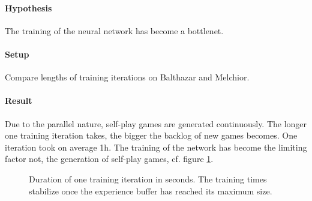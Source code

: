 \paragraph{Hypothesis} The training of the neural network has become a bottlenet.
\paragraph{Setup} Compare lengths of training iterations on Balthazar and Melchior.

\paragraph{Result} Due to the parallel nature, self-play games are generated continuously. The longer one training iteration takes, the bigger the backlog of new games becomes. One iteration took on average 1h. The training of the network has become the limiting factor not, the generation of self-play games, cf. figure \ref{iteration_duration}.

\begin{figure}[!h]
    \centering
    \hfill
    \caption{Duration of one training iteration in seconds. The training times stabilize once the experience buffer has reached its maximum size.}
    \label{iteration_duration}
\end{figure}